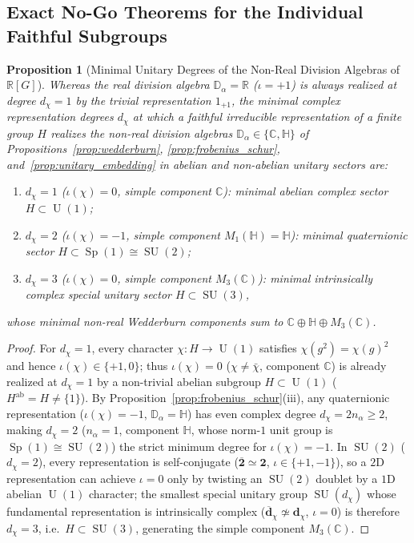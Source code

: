 \documentclass[11pt,a4paper]{article}
\newtheorem{proposition}[theorem]{Proposition}
\theoremstyle{definition}
\theoremstyle{remark}
\newcommand{\R}{\mathbb{R}}
\newcommand{\C}{\mathbb{C}}
\newcommand{\quat}{\mathbb{H}}
\newcommand{\SU}{\operatorname{SU}}
\newcommand{\U}{\operatorname{U}}
\begin{document}
\subsection{Exact No-Go Theorems for the Individual Faithful Subgroups}

\begin{proposition}[Minimal Unitary Degrees of the Non-Real Division Algebras of {$\R[G]$}]
\label{prop:minimal_degrees}
Whereas the real division algebra $\mathbb{D}_\alpha = \R$ ($\iota = +1$) is always realized at degree $d_\chi = 1$ by the trivial representation $1_{+1}$, the minimal complex representation degrees $d_\chi$ at which a faithful irreducible representation of a finite group $H$ realizes the non-real division algebras $\mathbb{D}_\alpha \in \{\C, \quat\}$ of Propositions~\ref{prop:wedderburn}, \ref{prop:frobenius_schur}, and~\ref{prop:unitary_embedding} in abelian and non-abelian unitary sectors are:
\begin{enumerate}
    \item $d_\chi = 1$ ($\iota(\chi) = 0$, simple component $\C$): minimal abelian complex sector $H \subset \U(1)$;
    \item $d_\chi = 2$ ($\iota(\chi) = -1$, simple component $M_1(\quat) = \quat$): minimal quaternionic sector $H \subset \operatorname{Sp}(1) \cong \SU(2)$;
    \item $d_\chi = 3$ ($\iota(\chi) = 0$, simple component $M_3(\C)$): minimal intrinsically complex special unitary sector $H \subset \SU(3)$,
\end{enumerate}
whose minimal non-real Wedderburn components sum to $\C \oplus \quat \oplus M_3(\C)$.
\end{proposition}

\begin{proof}
For $d_\chi = 1$, every character $\chi : H \to \U(1)$ satisfies $\chi(g^2) = \chi(g)^2$ and hence $\iota(\chi) \in \{+1, 0\}$; thus $\iota(\chi) = 0$ ($\chi \neq \bar{\chi}$, component $\C$) is already realized at $d_\chi = 1$ by a non-trivial abelian subgroup $H \subset \U(1)$ ($H^{\mathrm{ab}} = H \neq \{1\}$). By Proposition~\ref{prop:frobenius_schur}(iii), any quaternionic representation ($\iota(\chi) = -1$, $\mathbb{D}_\alpha = \quat$) has even complex degree $d_\chi = 2n_\alpha \ge 2$, making $d_\chi = 2$ ($n_\alpha = 1$, component $\quat$, whose norm-$1$ unit group is $\operatorname{Sp}(1) \cong \SU(2)$) the strict minimum degree for $\iota(\chi) = -1$. In $\SU(2)$ ($d_\chi = 2$), every representation is self-conjugate ($\overline{\mathbf{2}} \simeq \mathbf{2}$, $\iota \in \{+1, -1\}$), so a $2$D representation can achieve $\iota = 0$ only by twisting an $\SU(2)$ doublet by a $1$D abelian $\U(1)$ character; the smallest special unitary group $\SU(d_\chi)$ whose fundamental representation is intrinsically complex ($\overline{\mathbf{d}}_\chi \not\simeq \mathbf{d}_\chi$, $\iota = 0$) is therefore $d_\chi = 3$, i.e.\ $H \subset \SU(3)$, generating the simple component $M_3(\C)$.
\end{proof}
\end{document}
